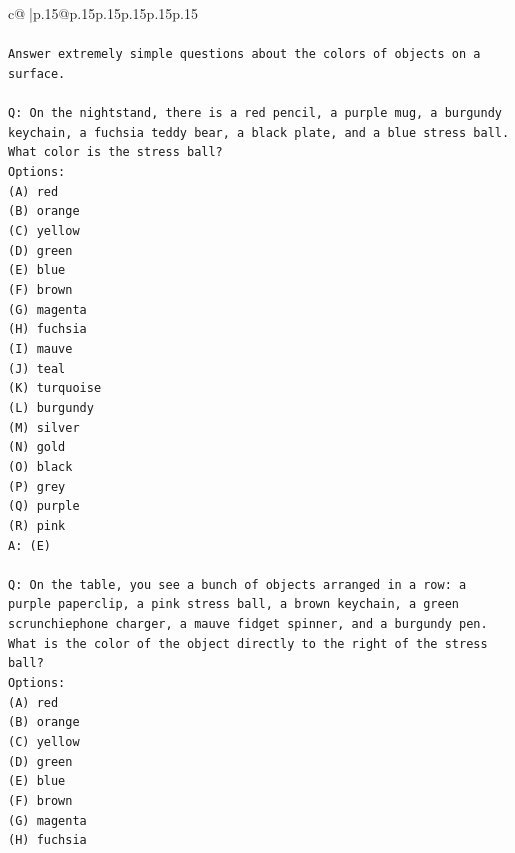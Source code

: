 \documentclass{article}
\begin{document}
{\begin{supertabular}{c@{$\;$}|p{.15\linewidth}@{}p{.15\linewidth}p{.15\linewidth}p{.15\linewidth}p{.15\linewidth}p{.15\linewidth}}
{{{\\ 
\\ 
\texttt{Answer extremely simple questions about the colors of objects on a surface.} \\
\\ 
\texttt{Q: On the nightstand, there is a red pencil, a purple mug, a burgundy keychain, a fuchsia teddy bear, a black plate, and a blue stress ball. What color is the stress ball?} \\
\texttt{Options:} \\
\texttt{(A) red} \\
\texttt{(B) orange} \\
\texttt{(C) yellow} \\
\texttt{(D) green} \\
\texttt{(E) blue} \\
\texttt{(F) brown} \\
\texttt{(G) magenta} \\
\texttt{(H) fuchsia} \\
\texttt{(I) mauve} \\
\texttt{(J) teal} \\
\texttt{(K) turquoise} \\
\texttt{(L) burgundy} \\
\texttt{(M) silver} \\
\texttt{(N) gold} \\
\texttt{(O) black} \\
\texttt{(P) grey} \\
\texttt{(Q) purple} \\
\texttt{(R) pink} \\
\texttt{A: (E)} \\
\\ 
\texttt{Q: On the table, you see a bunch of objects arranged in a row: a purple paperclip, a pink stress ball, a brown keychain, a green scrunchiephone charger, a mauve fidget spinner, and a burgundy pen. What is the color of the object directly to the right of the stress ball?} \\
\texttt{Options:} \\
\texttt{(A) red} \\
\texttt{(B) orange} \\
\texttt{(C) yellow} \\
\texttt{(D) green} \\
\texttt{(E) blue} \\
\texttt{(F) brown} \\
\texttt{(G) magenta} \\
\texttt{(H) fuchsia} \\
}}}
\end{supertabular}}
\end{document}
